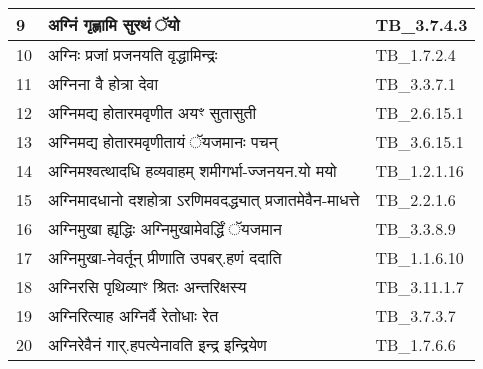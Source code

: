 \documentclass[17pt]{extarticle}
\begin{document}
\begin{longtable}{||p{0.4in}||p{4.9in}||p{0.9in}||}
    9 & अग्निं गृह्णामि सुरथं ॅयो & TB\_3.7.4.3       \\
    
    \hline
        
    10 & अग्निः प्रजां प्रजनयति वृद्धामिन्द्रः & TB\_1.7.2.4       \\
    
    \hline
        
    11 & अग्निना वै होत्रा देवा & TB\_3.3.7.1       \\
    
    \hline
        
    12 & अग्निमद्य होतारमवृणीत अयꣳ सुतासुती & TB\_2.6.15.1       \\
    
    \hline
        
    13 & अग्निमद्य होतारमवृणीतायं ॅयजमानः पचन् & TB\_3.6.15.1       \\
    
    \hline
        
    14 & अग्निमश्वत्थादधि हव्यवाहम् शमीगर्भा{-}ज्जनयन.यो मयो & TB\_1.2.1.16       \\
    
    \hline
        
    15 & अग्निमादधानो दशहोत्रा ऽरणिमवदद्ध्यात् प्रजातमेवैन{-}माधत्ते & TB\_2.2.1.6       \\
    
    \hline
        
    16 & अग्निमुखा ह्यृद्धिः अग्निमुखामेवर्द्धिं ॅयजमान & TB\_3.3.8.9       \\
    
    \hline
        
    17 & अग्निमुखा{-}नेवर्तून् प्रीणाति उपबर्.हणं ददाति & TB\_1.1.6.10       \\
    
    \hline
        
    18 & अग्निरसि पृथिव्याꣳ श्रितः अन्तरिक्षस्य & TB\_3.11.1.7       \\
    
    \hline
        
    19 & अग्निरित्याह अग्निर्वै रेतोधाः रेत & TB\_3.7.3.7       \\
    
    \hline
        
    20 & अग्निरेवैनं गार्.हपत्येनावति इन्द्र इन्द्रियेण & TB\_1.7.6.6       \\
    
    \hline
        

\end{longtable}
\end{document}
